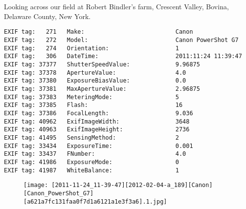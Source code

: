 \section{\protect{}}
\noindent Looking across our field at Robert Bindler's farm, Crescent Valley, Bovina, Delaware County, New York.
\noindent
\begin{lstlisting}
EXIF tag:   271   Make:                          Canon
EXIF tag:   272   Model:                         Canon PowerShot G7
EXIF tag:   274   Orientation:                   1
EXIF tag:   306   DateTime:                      2011:11:24 11:39:47
EXIF tag: 37377   ShutterSpeedValue:             9.96875
EXIF tag: 37378   ApertureValue:                 4.0
EXIF tag: 37380   ExposureBiasValue:             0.0
EXIF tag: 37381   MaxApertureValue:              2.96875
EXIF tag: 37383   MeteringMode:                  5
EXIF tag: 37385   Flash:                         16
EXIF tag: 37386   FocalLength:                   9.036
EXIF tag: 40962   ExifImageWidth:                3648
EXIF tag: 40963   ExifImageHeight:               2736
EXIF tag: 41495   SensingMethod:                 2
EXIF tag: 33434   ExposureTime:                  0.001
EXIF tag: 33437   FNumber:                       4.0
EXIF tag: 41986   ExposureMode:                  0
EXIF tag: 41987   WhiteBalance:                  1

\end{lstlisting}
\clearpage
\begin{figure}
\raggedleft
\texttt{[image: [2011-11-24\_11-39-47][2012-02-04-a\_189][Canon][Canon\_PowerShot\_G7][a621a7fc131faa0f7d1a6121a1e3f3a6].1.jpg]}
\end{figure}


\clearpage
